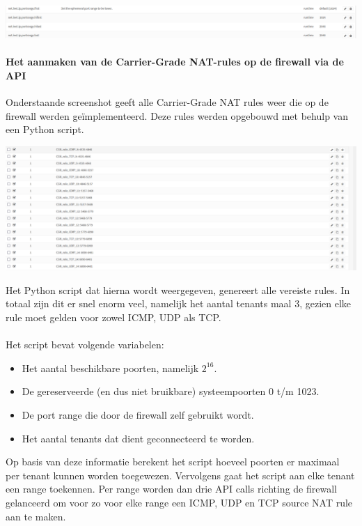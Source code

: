 \includegraphics[width=\textwidth]{graphics/opnsense_tunables_portrange.PNG}

\paragraph{Het aanmaken van de Carrier-Grade NAT-rules op de firewall via de API}
Onderstaande screenshot geeft alle Carrier-Grade NAT rules weer die op de firewall werden geïmplementeerd. Deze rules werden opgebouwd met behulp van een Python script.

\includegraphics[width=\textwidth]{graphics/opnsense_cgnat_rules.PNG}

Het Python script dat hierna wordt weergegeven, genereert alle vereiste rules. In totaal zijn dit er snel enorm veel, namelijk het aantal tenants maal 3, gezien elke rule moet gelden voor zowel ICMP, UDP als TCP.

\paragraph{}
Het script bevat volgende variabelen:

\begin{itemize}
    \item Het aantal beschikbare poorten, namelijk $2^{16}$.
    \item De gereserveerde (en dus niet bruikbare) systeempoorten 0 t/m 1023.
    \item De port range die door de firewall zelf gebruikt wordt.
    \item Het aantal tenants dat dient geconnecteerd te worden.
\end{itemize}

Op basis van deze informatie berekent het script hoeveel poorten er maximaal per tenant kunnen worden toegewezen.
Vervolgens gaat het script aan elke tenant een range toekennen.
Per range worden dan drie API calls richting de firewall gelanceerd om voor zo voor elke range een ICMP, UDP en TCP source NAT rule aan te maken.


